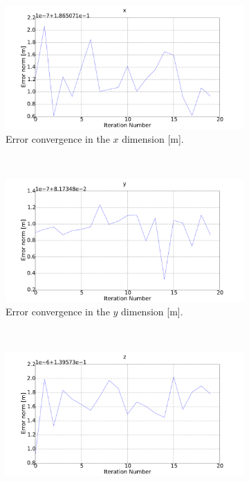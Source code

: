 \begin{figure}
  \centering
  \begin{subfigure}{0.45\textwidth}
    \includegraphics[width=\textwidth]{figures/chapter3/err_x}
    \caption{Error convergence in the $x$ dimension [m].}
\label{fig:err-convergence-x}
  \end{subfigure}
~
  \begin{subfigure}{0.45\textwidth}
    \includegraphics[width=\textwidth]{figures/chapter3/err_y}
    \caption{Error convergence in the $y$ dimension [m].}
\label{fig:err-convergence-y}
  \end{subfigure}
~
\begin{subfigure}{0.45\textwidth}
    \includegraphics[width=\textwidth]{figures/chapter3/err_z}

\end{subfigure}
\end{figure}
